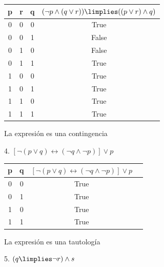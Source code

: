 \documentclass{article}
\begin{document}
\begin{center}
    \begin{tabular}{| c | c | c | c |}
        \hline
        p & r & q & $(\lnot p \land (q \lor r)) \limplies ((p \lor r) \land q)$ \\
        \hline
        0 & 0 & 0 & True \\
        0 & 0 & 1 & False \\
        0 & 1 & 0 & False \\
        0 & 1 & 1 & True \\
        1 & 0 & 0 & True \\
        1 & 0 & 1 & True \\
        1 & 1 & 0 & True \\
        1 & 1 & 1 & True \\
        \hline
    \end{tabular}

    \bigskip

    La expresión es una contingencia
\end{center}

\vspace{0.5cm}

4. $[\lnot (p \lor q) \leftrightarrow (\lnot q \land \lnot p)] \lor p$

\begin{center}
    \begin{tabular}{| c | c | c | c |}
        \hline
        p & q & $[\lnot (p \lor q) \leftrightarrow (\lnot q \land \lnot p)] \lor p$ \\
        \hline
        0 & 0 & True \\
        0 & 1 & True \\
        1 & 0 & True \\
        1 & 1 & True \\
        \hline
    \end{tabular}

    \bigskip

    La expresión es una tautología
\end{center}

\vspace{0.5cm}

5. $(q \limplies \lnot r) \land s$
\end{document}
